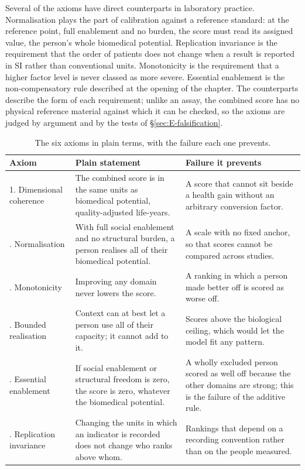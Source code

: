 Several of the axioms have direct counterparts in laboratory practice.
Normalisation plays the part of calibration against a reference standard: at
the reference point, full enablement and no burden, the score must read its
assigned value, the person's whole biomedical potential. Replication invariance
is the requirement that the order of patients does not change when a result is
reported in SI rather than conventional units. Monotonicity is the requirement
that a higher factor level is never classed as more severe. Essential enablement
is the non-compensatory rule described at the opening of the chapter. The
counterparts describe the form of each requirement; unlike an assay, the
combined score has no physical reference material against which it can be
checked, so the axioms are judged by argument and by the tests of
\S\ref{sec:E-falsification}.

\begin{table}[htbp]\centering
\caption{The six axioms in plain terms, with the failure each one prevents.}
\label{tab:E-plain}
\footnotesize
\begin{tabular}{p{2.6cm} p{5.4cm} p{5.6cm}}
\toprule
\textbf{Axiom} & \textbf{Plain statement} & \textbf{Failure it prevents} \\
\midrule
1. Dimensional coherence & The combined score is in the same units as biomedical potential, quality-adjusted life-years. & A score that cannot sit beside a health gain without an arbitrary conversion factor. \\
\addlinespace
2. Normalisation & With full social enablement and no structural burden, a person realises all of their biomedical potential. & A scale with no fixed anchor, so that scores cannot be compared across studies. \\
\addlinespace
3. Monotonicity & Improving any domain never lowers the score. & A ranking in which a person made better off is scored as worse off. \\
\addlinespace
4. Bounded realisation & Context can at best let a person use all of their capacity; it cannot add to it. & Scores above the biological ceiling, which would let the model fit any pattern. \\
\addlinespace
5. Essential enablement & If social enablement or structural freedom is zero, the score is zero, whatever the biomedical potential. & A wholly excluded person scored as well off because the other domains are strong; this is the failure of the additive rule. \\
\addlinespace
6. Replication invariance & Changing the units in which an indicator is recorded does not change who ranks above whom. & Rankings that depend on a recording convention rather than on the people measured. \\
\bottomrule
\end{tabular}
\end{table}

